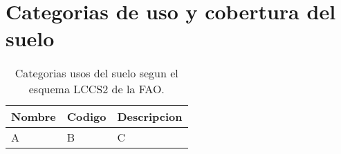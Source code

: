 \documentclass[hidelinks,12pt]{article}
\begin{document}
\appendix

\section{Categorias de uso y cobertura del suelo}
\begin{table}
    \centering
    \begin{tabular}{lll}
        \toprule
        Nombre & Codigo & Descripcion\\
        \midrule 
        A & B & C \\
        \bottomrule
    \end{tabular}
\caption{\label{tabla1}Categorias usos del suelo segun el esquema LCCS2 de la
FAO.}
\end{table}

\end{document}
